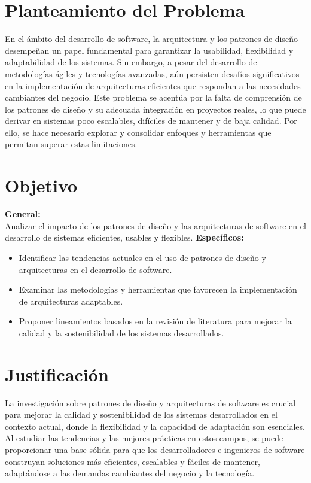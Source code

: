 \documentclass[twocolumn]{article}
\begin{document}
\section{Planteamiento del Problema}
En el ámbito del desarrollo de software, la arquitectura y los patrones de diseño desempeñan un papel fundamental para garantizar la usabilidad, flexibilidad y adaptabilidad de los sistemas. Sin embargo, a pesar del desarrollo de metodologías ágiles y tecnologías avanzadas, aún persisten desafíos significativos en la implementación de arquitecturas eficientes que respondan a las necesidades cambiantes del negocio. Este problema se acentúa por la falta de comprensión de los patrones de diseño y su adecuada integración en proyectos reales, lo que puede derivar en sistemas poco escalables, difíciles de mantener y de baja calidad. Por ello, se hace necesario explorar y consolidar enfoques y herramientas que permitan superar estas limitaciones.
\section{Objetivo}
\textbf{General:} \\
Analizar el impacto de los patrones de diseño y las arquitecturas de software en el desarrollo de sistemas eficientes, usables y flexibles.
\textbf{Específicos:}
\begin{itemize}
    \item Identificar las tendencias actuales en el uso de patrones de diseño y arquitecturas en el desarrollo de software.
    \item Examinar las metodologías y herramientas que favorecen la implementación de arquitecturas adaptables.
    \item Proponer lineamientos basados en la revisión de literatura para mejorar la calidad y la sostenibilidad de los sistemas desarrollados.
\end{itemize}
\section{Justificación}
La investigación sobre patrones de diseño y arquitecturas de software es crucial para mejorar la calidad y sostenibilidad de los sistemas desarrollados en el contexto actual, donde la flexibilidad y la capacidad de adaptación son esenciales. Al estudiar las tendencias y las mejores prácticas en estos campos, se puede proporcionar una base sólida para que los desarrolladores e ingenieros de software construyan soluciones más eficientes, escalables y fáciles de mantener, adaptándose a las demandas cambiantes del negocio y la tecnología.
\end{document}
